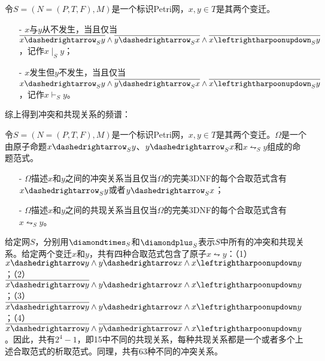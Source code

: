 \begin{definition}[不发生]
令$S=(N=(P,T,F),M)$是一个标识Petri网，$x,y\in T$是其两个变迁。
  \begin{itemize}
    \item[-] $x$与$y$从不发生，当且仅当$\overline{x\dashedrightarrow_{S}y}\wedge\overline{y\dashedrightarrow_{S}x}\wedge\overline{x\leftrightharpoonupdown_{S}y}$，记作$x\mid_{S}y$；
    \item[-] $x$发生但$y$不发生，当且仅当$x\dashedrightarrow_{S}y\wedge\overline{y\dashedrightarrow_{S}x}\wedge\overline{x\leftrightharpoonupdown_{S}y}$，记作$x\vdash_{S}y$。
  \end{itemize}
\end{definition}
综上得到冲突和共现关系的频谱：
\begin{definition}[冲突和共现关系的频谱]\label{def:spectrum_of_conflict_cooccurence}
令$S=(N=(P,T,F),M)$是一个标识Petri网，$x,y\in T$是其两个变迁。$\Omega$是一个由原子命题$x\dashedrightarrow_{S}y$、$y\dashedrightarrow_{S}x$和$x\leftrightharpoonupdown_{S}y$组成的命题范式。
  \begin{itemize}
    \item[-] $\Omega$描述$x$和$y$之间的冲突关系当且仅当$\Omega$的完美3DNF的每个合取范式含有$x\dashedrightarrow_{S}y$或者$y\dashedrightarrow_{S}x$；
    \item[-] $\Omega$描述$x$和$y$之间的共现关系当且仅当$\Omega$的完美3DNF的每个合取范式含有$x\leftrightharpoonupdown_{S}y$。
  \end{itemize}
\end{definition}
给定网$S$，分别用$\diamondtimes_{S}$和$\diamondplus_{S}$表示$S$中所有的冲突和共现关系。给定两个变迁$x$和$y$，共有四种合取范式包含了原子$x\leftrightharpoonupdown y$：（1）$x\dashedrightarrow y\wedge y\dashedrightarrow x\wedge x\leftrightharpoonupdown y$；（2）$\overline{x\dashedrightarrow y}\wedge y\dashedrightarrow x\wedge x\leftrightharpoonupdown y$；（3）$\overline{x\dashedrightarrow y}\wedge y\dashedrightarrow x\wedge x\leftrightharpoonupdown y$；（4）$\overline{x\dashedrightarrow y}\wedge\overline{y\dashedrightarrow x}\wedge x\leftrightharpoonupdown y$。因此，共有$2^{4}-1$，即15中不同的共现关系，每种共现关系都是一个或者多个上述合取范式的析取范式。同理，共有63种不同的冲突关系。


